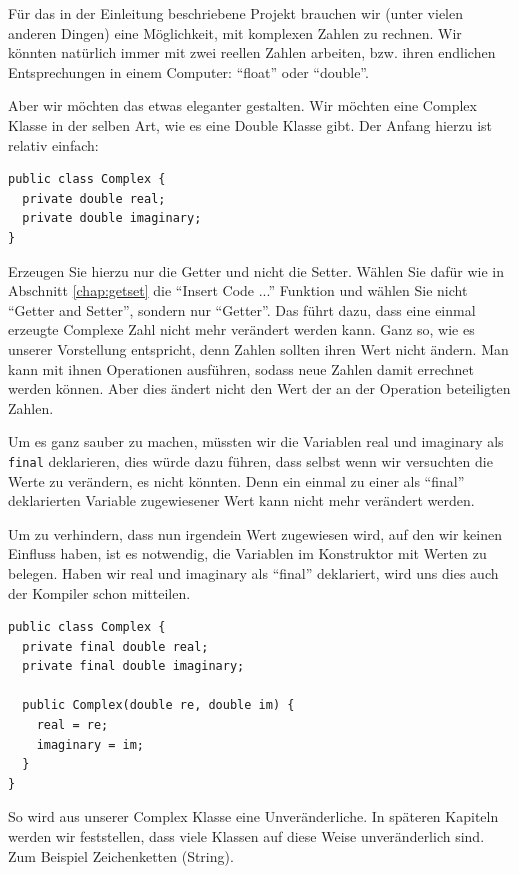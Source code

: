 Für das in der Einleitung beschriebene Projekt brauchen wir (unter vielen anderen Dingen) eine Möglichkeit, mit komplexen Zahlen zu rechnen. Wir könnten natürlich immer mit zwei reellen Zahlen arbeiten, bzw. ihren endlichen Entsprechungen in einem Computer: "`float"' oder "`double"'. 

Aber wir möchten das etwas eleganter gestalten. Wir möchten eine Complex Klasse in der selben Art, wie es eine Double Klasse gibt. Der Anfang hierzu ist relativ einfach: 
\begin{lstlisting}
public class Complex {
  private double real;
  private double imaginary;
}
\end{lstlisting}
Erzeugen Sie hierzu nur die Getter und nicht die Setter. Wählen Sie dafür wie in Abschnitt \ref{chap:getset} die "`Insert Code ..."' Funktion und wählen Sie nicht "`Getter and Setter"', sondern nur "`Getter"'. Das führt dazu, dass eine einmal erzeugte Complexe Zahl nicht mehr verändert werden kann. Ganz so, wie es unserer Vorstellung entspricht, denn Zahlen sollten ihren Wert nicht ändern. Man kann mit ihnen Operationen ausführen, sodass neue Zahlen damit errechnet werden können. Aber dies ändert nicht den Wert der an der Operation beteiligten Zahlen. 

Um es ganz sauber zu machen, müssten wir die Variablen real und imaginary als \texttt{final} deklarieren, dies würde dazu führen, dass selbst wenn wir versuchten die Werte zu verändern, es nicht könnten. Denn ein einmal zu einer als "`final"' deklarierten Variable zugewiesener Wert kann nicht mehr verändert werden.

Um zu verhindern, dass nun irgendein Wert zugewiesen wird, auf den wir keinen Einfluss haben, ist es notwendig, die Variablen im Konstruktor mit Werten zu belegen. Haben wir real und imaginary als "`final"' deklariert, wird uns dies auch der Kompiler schon mitteilen. 
\begin{lstlisting}
public class Complex {
  private final double real;
  private final double imaginary;
  
  public Complex(double re, double im) {
    real = re;
    imaginary = im;
  }
}
\end{lstlisting}
So wird aus unserer Complex Klasse eine Unveränderliche. In späteren Kapiteln werden wir feststellen, dass viele Klassen auf diese Weise unveränderlich sind. Zum Beispiel Zeichenketten (String).

